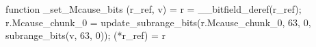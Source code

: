 function _set_Mcause_bits (r_ref, v) = {
    r = __bitfield_deref(r_ref);
    r.Mcause_chunk_0 = update_subrange_bits(r.Mcause_chunk_0, 63, 0, subrange_bits(v, 63, 0));
    (*r_ref) = r
}
